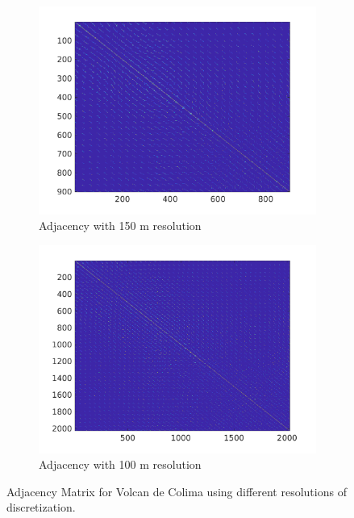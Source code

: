 \begin{figure}[H]
\begin{subfigure}{0.48\textwidth}
\includegraphics[width=\textwidth]{dem_figs/colima_adjacency_150}
\caption{Adjacency with 150 m resolution}
\label{colima_adjacency_150}
\end{subfigure}
\centering
\begin{subfigure}{0.48\textwidth}
\includegraphics[width=\textwidth]{dem_figs/colima_adjacency_100}
\caption{Adjacency with 100 m resolution}
\label{colima_adjacency_100}
\end{subfigure} 
\caption{Adjacency Matrix for Volcan de Colima using different resolutions of discretization.}
\label{fig:colima_adjacency}
\end{figure}

